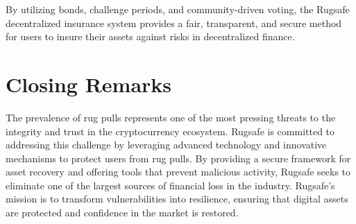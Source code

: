 \documentclass{article}
\begin{document}
By utilizing bonds, challenge periods, and community-driven voting, the Rugsafe decentralized insurance system provides a fair, transparent, and secure method for users to insure their assets against risks in decentralized finance.















\section{Closing Remarks}
The prevalence of rug pulls represents one of the most pressing threats to the integrity and trust in the cryptocurrency ecosystem. Rugsafe is committed to addressing this challenge by leveraging advanced technology and innovative mechanisms to protect users from rug pulls. By providing a secure framework for asset recovery and offering tools that prevent malicious activity, Rugsafe seeks to eliminate one of the largest sources of financial loss in the industry. Rugsafe’s mission is to transform vulnerabilities into resilience, ensuring that digital assets are protected and confidence in the market is restored.
\end{document}
